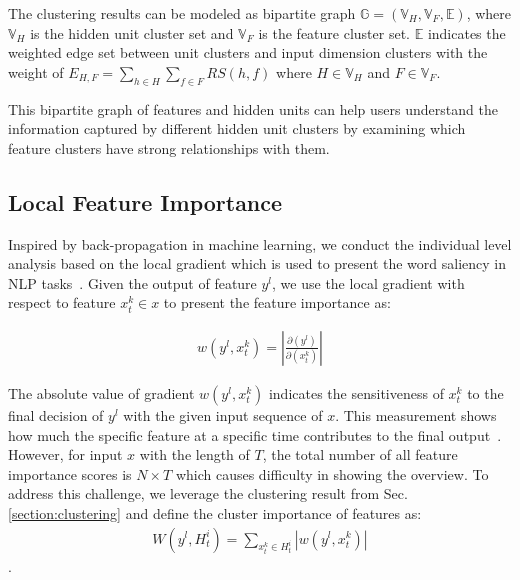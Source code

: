 The clustering results can be modeled as bipartite graph $\mathbb{G} = (\mathbb{V}_H, \mathbb{V}_F, \mathbb{E})$, where $\mathbb{V}_H$ is the hidden unit cluster set and $\mathbb{V}_F$ is the feature cluster set. $\mathbb{E}$ indicates the weighted edge set between unit clusters and input dimension clusters with the weight of $E_{H,F} = \displaystyle\sum_{h \in H}\displaystyle\sum_{f \in F}RS(h, f)$ where $H \in \mathbb{V}_H$ and $F \in \mathbb{V}_F$. 

This bipartite graph of features and hidden units can help users understand the information captured by different hidden unit clusters by examining which feature clusters have strong relationships with them.



\subsection{Local Feature Importance}\label{section:feature_importance}

Inspired by back-propagation in machine learning, we conduct the individual level analysis based on the local gradient which is used to present the word saliency in NLP tasks~\cite{li2015visualizing}. 
Given the output of feature $y^l$, we use the local gradient with respect to feature $x_t^k \in x$ to present the feature importance as:

\vspace{-3mm}
\begin{equation}
    \label{equation:feature_gradient}
    \begin{multlined}
    w(y^l, x_t^k) = |\frac{\partial(y^l)}{\partial(x_t^k)}|
    \end{multlined}
\end{equation}


The absolute value of gradient $w(y^l, x_t^k)$ indicates the sensitiveness of $x_t^k$ to the final decision of  $y^l$ with the given input sequence of $x$. This measurement shows how much the specific feature at a specific time contributes to the final output~\cite{li2015visualizing}.
However, for input $x$ with the length of $T$,  the total number of all feature importance scores is $N \times T$ which causes difficulty in showing the overview. To address this challenge, we leverage the clustering result from Sec.\ref{section:clustering} and define the cluster importance of features as:
\begin{equation}
    \label{equation:cluster_gradient}
    \begin{multlined}
    W(y^l, H^i_t) =\displaystyle\sum_{x^k_t \in H^i_t}|w(y^l, x^k_t)|
 \end{multlined}
\end{equation}
. 
